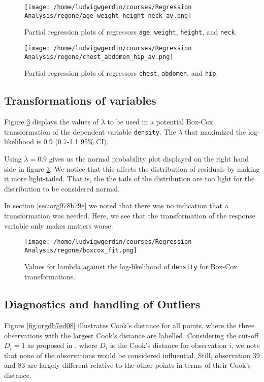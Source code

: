 \documentclass[11pt]{article}
\begin{document}
\begin{figure}[htbp]
\centering
\texttt{[image: /home/ludvigwgerdin/courses/Regression Analysis/regone/age\_weight\_height\_neck\_av.png]}
\caption{\label{fig:org8318a5d}
Partial regression plots of regressors \texttt{age}, \texttt{weight}, \texttt{height}, and \texttt{neck}.}
\end{figure}

\begin{figure}[htbp]
\centering
\texttt{[image: /home/ludvigwgerdin/courses/Regression Analysis/regone/chest\_abdomen\_hip\_av.png]}
\caption{\label{fig:org7f27407}
Partial regression plots of regressors \texttt{chest}, \texttt{abdomen}, and \texttt{hip}.}
\end{figure}
\subsection{Transformations of variables}
\label{sec:org110bf12}

Figure \ref{fig:orgc51dfd4} displays the values of \(\lambda\) to be used in a potential Box-Cox transformation of 
the dependent variable \texttt{density}. The \(\lambda\) that maximized the log-likelihood is 0.9 (0.7-1.1 95\% CI). 

Using \(\lambda = 0.9\) gives us the normal probability plot displayed on the right hand side in figure \ref{fig:orgc51dfd4}.
We notice that this affects the distribution of residuals by making it more light-tailed. That is, the 
the tails of the distribution are too light for the distribution to be considered normal.

In section \ref{sec:org978b79e} we noted that there was no indication that a transformation was needed. 
Here, we see that the transformation of the response variable only makes matters worse.

\begin{figure}[h]
\centering
\texttt{[image: /home/ludvigwgerdin/courses/Regression Analysis/regone/boxcox\_fit.png]}
\caption{\label{fig:orgc51dfd4}
Values for lambda against the log-likelihood of \texttt{density} for Box-Cox transformations.}
\end{figure}

\subsection{Diagnostics and handling of Outliers}
\label{sec:orgb3f92c2}

Figure \ref{fig:orgdb7ed08} illustrates Cook's distance for all points, where the three observations with the largest 
Cook's distance are labelled. Considering the cut-off \(D_i = 1\) as proposed in \cite{Montgomery2012}, 
where \(D_i\) is the Cook's distance for observation \(i\), we note that none of the observations would be 
considered influential. Still, observation 39 and 83 are largely different relative
to the other points in terms of their Cook's distance. 
\end{document}
